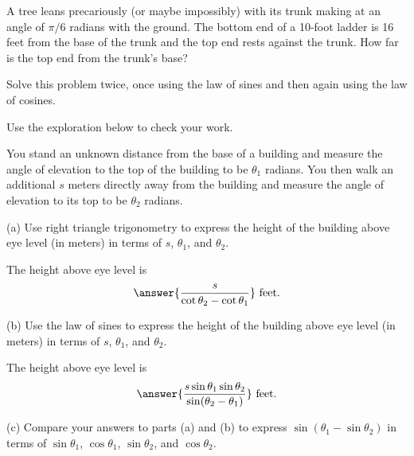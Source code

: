 \documentclass{ximera}
\begin{document}
\begin{question} \label{Q00:SineCosine}
A tree leans precariously (or maybe impossibly) with its trunk making at an angle of $\pi/6$ radians with the ground. The bottom end of a 10-foot ladder is 16 feet from the base of the trunk and the top end rests against the trunk. How far is the top end from the trunk's base? 

Solve this problem twice, once using the law of sines and then again using the law of cosines.

Use the exploration below to check your work.

\begin{exploration}

 
\begin{onlineOnly}
    \begin{center}
\end{center}
\end{onlineOnly}
\end{exploration} 

\end{question}


\begin{question} \label{Q1:SineCosine}
You stand an unknown distance from the base of a building and measure the angle of elevation to the top of the building to be $\theta_1$ radians. You then walk an additional $s$ meters directly away from the building and measure the angle of elevation to its top to be $\theta_2$ radians. 

(a) Use right triangle trigonometry to express the height of the building above eye level (in meters) in terms of $s$, $\theta_1$, and $\theta_2$.


The height above eye level is 
\[
       \answer{\frac{s}{\cot\theta_2-\cot \theta_1}} \text{ feet}.
\]

(b) Use the law of sines to express the height of the building above eye level (in meters) in terms of $s$, $\theta_1$, and $\theta_2$.

The height above eye level is 
\[
       \answer{\frac{s \sin \theta_1 \sin\theta_2}{\sin(\theta_2-\theta_1)}} \text{ feet}.
\]

(c) Compare your answers to parts (a) and (b) to express $\sin(\theta_1 - \sin\theta_2)$ in terms of $\sin\theta_1$, $\cos\theta_1$, $\sin\theta_2$, and $\cos\theta_2$.

\end{question}
\end{document}
